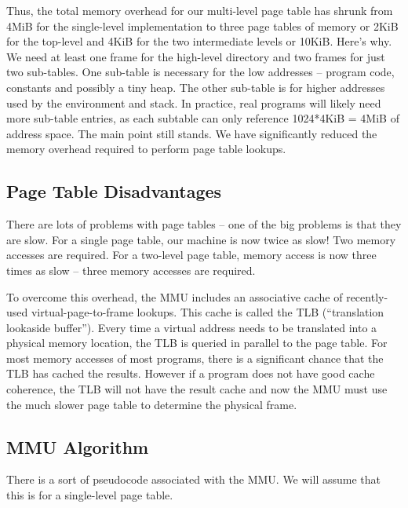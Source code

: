 Thus, the total memory overhead for our multi-level page table has shrunk from 4MiB for the single-level implementation to three page tables of memory or 2KiB for the top-level and 4KiB for the two intermediate levels or 10KiB.
Here's why.
We need at least one frame for the high-level directory and two frames for just two sub-tables.
One sub-table is necessary for the low addresses -- program code, constants and possibly a tiny heap.
The other sub-table is for higher addresses used by the environment and stack.
In practice, real programs will likely need more sub-table entries, as each subtable can only reference 1024*4KiB = 4MiB of address space.
The main point still stands.
We have significantly reduced the memory overhead required to perform page table lookups.

\subsection{Page Table Disadvantages}

There are lots of problems with page tables -- one of the big problems is that they are slow.
For a single page table, our machine is now twice as slow!
Two memory accesses are required.
For a two-level page table, memory access is now three times as slow -- three memory accesses are required.

To overcome this overhead, the MMU includes an associative cache of recently-used virtual-page-to-frame lookups.
This cache is called the TLB (``translation lookaside buffer'').
Every time a virtual address needs to be translated into a physical memory location, the TLB is queried in parallel to the page table.
For most memory accesses of most programs, there is a significant chance that the TLB has cached the results.
However if a program does not have good cache coherence, the TLB will not have the result cache and now the MMU must use the much slower page table to determine the physical frame.

\subsection{MMU Algorithm}

There is a sort of pseudocode associated with the MMU.
We will assume that this is for a single-level page table.

